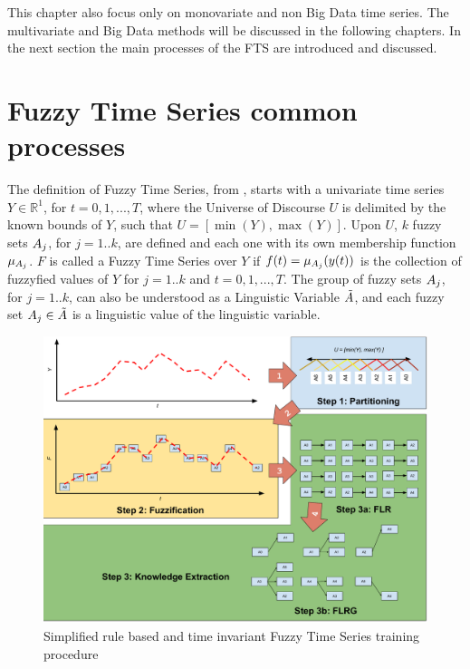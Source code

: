 This chapter also focus only on monovariate and non Big Data time series. The multivariate and Big Data methods will be discussed in the following chapters. In the next section the main processes of the FTS are introduced and discussed.


\section{Fuzzy Time Series common processes}
\label{sec:common_fts} 


The definition of Fuzzy Time Series, from \cite{song1993fuzzy}, starts with a univariate time series $Y \in \mathbb{R}^1$, for $t = 0,1,...,T$, where the Universe of Discourse $U$ is delimited by the known bounds of $Y$, such that $U = [\min(Y),\max(Y)]$. Upon $U$, $k$ fuzzy sets $A_j$, for $j = 1..k$, are defined and each one with its own membership function $\mu_{A_j}$. $F$ is called a Fuzzy Time Series over $Y$ if $f(t) = \mu_{A_j}(y(t))$ is the collection of fuzzyfied values of $Y$ for $j = 1..k$ and $t = 0,1,...,T$. The group of fuzzy sets $A_j$, for $j = 1..k$, can also be understood as a Linguistic Variable $\tilde{A}$, and each fuzzy set $A_j \in \tilde{A}$ is a linguistic value of the linguistic variable. 

\begin{figure}[htb]
    \centering
    \includegraphics[width=\textwidth]{figures/fts_simplified.pdf}
    \caption{Simplified rule based and time invariant Fuzzy Time Series training procedure}
    \label{fig:fts_simplified}
\end{figure}


